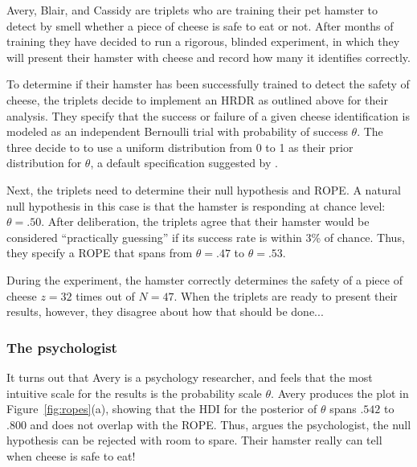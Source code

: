 \documentclass[9pt,twocolumn,twoside]{cidlab-draft}\templatetype{cidlab-invited}
\newcommand{\hdr}{HRDR}
\begin{document}
Avery, Blair, and Cassidy are triplets who are training their pet hamster to detect by smell whether a piece of cheese is safe to eat or not. After months of training they have decided to run a rigorous, blinded experiment, in which they will present their hamster with cheese and record how many it identifies correctly.

To determine if their hamster has been successfully trained to detect the safety of cheese, the triplets decide to implement an \hdr{} as outlined above for their analysis. They specify that the success or failure of a given cheese identification is modeled as an independent Bernoulli trial with probability of success $\theta$. The three decide to to use a uniform distribution from 0 to 1 as their prior distribution for $\theta$, a default specification suggested by . 

Next, the triplets need to determine their null hypothesis and ROPE. A natural null hypothesis in this case is that the hamster is responding at chance level: $\theta=.50$. After deliberation, the triplets agree that their hamster would be considered ``practically guessing'' if its success rate is within 3\% of chance. Thus, they specify a ROPE that spans from $\theta=.47$ to $\theta=.53$.

During the experiment, the hamster correctly determines the safety of a piece of cheese $z=32$ times out of $N=47$. When the triplets are ready to present their results, however, they disagree about how that should be done...

\subsubsection{The psychologist} It turns out that Avery is a psychology researcher, and feels that the most intuitive scale for the results is the probability scale $\theta$. Avery produces the plot in Figure~\ref{fig:ropes}(a), showing that the HDI for the posterior of $\theta$ spans $.542$ to $.800$ and does not overlap with the ROPE.  Thus, argues the psychologist, the null hypothesis can be rejected with room to spare. Their hamster really can tell when cheese is safe to eat!
\end{document}

